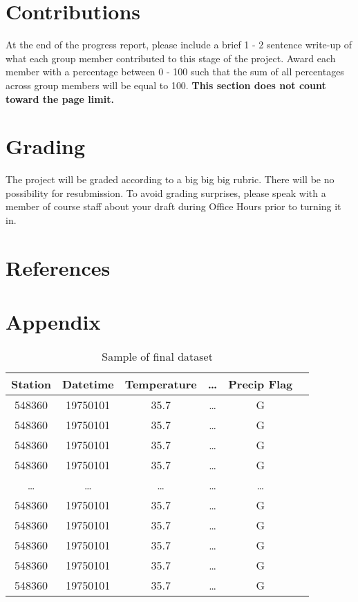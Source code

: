 \documentclass[conference]{IEEEtran}
\begin{document}
\section{Contributions}

At the end of the progress report, please include a brief 1 - 2 sentence write-up of what each group member contributed to this stage of the project. Award each member with a percentage between 0 - 100 such that the sum of all percentages across group members will be equal to 100. \textbf{This section does not count toward the page limit.}

\section{Grading}

The project will be graded according to a big big big rubric. There will be no possibility for resubmission. To avoid grading surprises, please speak with a member of course staff about your draft during Office Hours prior to turning it in.

\section{References}

\section{Appendix}

\begin{table}[h!]
\centering
 \begin{tabular}{||c c c c c c||} 
 \hline
  Station& Datetime &Temperature & \dots & Precip Flag \\ [0.5ex] 
 \hline\hline
 548360 & 19750101 & 35.7 & \dots & G \\
 548360 & 19750101 & 35.7 & \dots & G \\
 548360 & 19750101 & 35.7 & \dots & G \\
 548360 & 19750101 & 35.7 & \dots & G \\
 \dots & \dots & \dots & \dots & \dots \\
 548360 & 19750101 & 35.7 & \dots & G \\
 548360 & 19750101 & 35.7 & \dots & G \\
 548360 & 19750101 & 35.7 & \dots & G \\
 548360 & 19750101 & 35.7 & \dots & G \\
 548360 & 19750101 & 35.7 & \dots & G \\[1ex] 
 
 \hline
 \end{tabular}
 \caption{Sample of final dataset}
\end{table}
\end{document}
